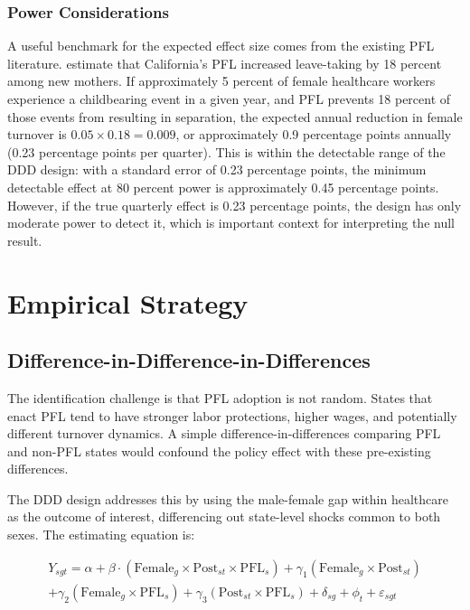 \documentclass[12pt]{article}
\begin{document}
\subsubsection*{Power Considerations} A useful benchmark for the expected effect size comes from the existing PFL literature. \citet{baum2016} estimate that California's PFL increased leave-taking by 18 percent among new mothers. If approximately 5 percent of female healthcare workers experience a childbearing event in a given year, and PFL prevents 18 percent of those events from resulting in separation, the expected annual reduction in female turnover is $0.05 \times 0.18 = 0.009$, or approximately 0.9 percentage points annually (0.23 percentage points per quarter). This is within the detectable range of the DDD design: with a standard error of 0.23 percentage points, the minimum detectable effect at 80 percent power is approximately 0.45 percentage points. However, if the true quarterly effect is 0.23 percentage points, the design has only moderate power to detect it, which is important context for interpreting the null result.


\section{Empirical Strategy}\label{sec:empirical}

\subsection{Difference-in-Difference-in-Differences}

The identification challenge is that PFL adoption is not random. States that enact PFL tend to have stronger labor protections, higher wages, and potentially different turnover dynamics. A simple difference-in-differences comparing PFL and non-PFL states would confound the policy effect with these pre-existing differences.

The DDD design addresses this by using the male-female gap within healthcare as the outcome of interest, differencing out state-level shocks common to both sexes. The estimating equation is:

\begin{multline}\label{eq:ddd}
Y_{sgt} = \alpha + \beta \cdot (\text{Female}_g \times \text{Post}_{st} \times \text{PFL}_s) + \gamma_1 (\text{Female}_g \times \text{Post}_{st}) \\
+ \gamma_2 (\text{Female}_g \times \text{PFL}_s) + \gamma_3 (\text{Post}_{st} \times \text{PFL}_s) + \delta_{sg} + \phi_t + \varepsilon_{sgt}
\end{multline}
\end{document}

